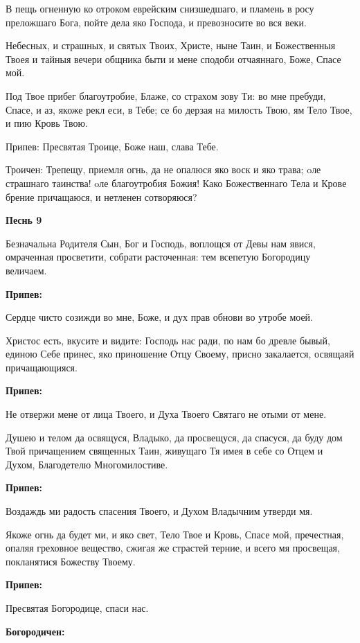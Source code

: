 В пещь огненную ко отроком еврейским снизшедшаго, и пламень в росу преложшаго Бога, пойте дела яко Господа, и превозносите во вся веки.


Небесных, и страшных, и святых Твоих, Христе, ныне Таин, и Божественныя Твоея и тайныя вечери общника быти и мене сподоби отчаяннаго, Боже, Спасе мой.


Под Твое прибег благоутробие, Блаже, со страхом зову Ти: во мне пребуди, Спасе, и аз, якоже рекл еси, в Тебе; се бо дерзая на милость Твою, ям Тело Твое, и пию Кровь Твою.


Припев: Пресвятая Троице, Боже наш, слава Тебе.


Троичен: Трепещу, приемля огнь, да не опалюся яко воск и яко трава; oле страшнаго таинства! oле благоутробия Божия! Како Божественнаго Тела и Крове брение причащаюся, и нетленен сотворяюся?

\medskip
\bfseries Песнь 9\normalfont{}


Безначальна Родителя Сын, Бог и Господь, воплощся от Девы нам явися, омраченная просветити, собрати расточенная: тем всепетую Богородицу величаем.

\medskip
\bfseries Припев:\normalfont{} 


Сердце чисто созижди во мне, Боже, и дух прав обнови во утробе моей.


Христос есть, вкусите и видите: Господь нас ради, по нам бо древле бывый, единою Себе принес, яко приношение Отцу Своему, присно закалается, освящаяй причащающияся.


\medskip
\bfseries Припев:\normalfont{} 


Не отвержи мене от лица Твоего, и Духа Твоего Святаго не отыми от мене.


Душею и телом да освящуся, Владыко, да просвещуся, да спасуся, да буду дом Твой причащением священных Таин, живущаго Тя имея в себе со Отцем и Духом, Благодетелю Многомилостиве.


\medskip
\bfseries Припев:\normalfont{} 


Воздаждь ми радость спасения Твоего, и Духом Владычним утверди мя.


Якоже огнь да будет ми, и яко свет, Тело Твое и Кровь, Спасе мой, пречестная, опаляя греховное вещество, сжигая же страстей терние, и всего мя просвещая, покланятися Божеству Твоему.


\medskip
\bfseries Припев:\normalfont{} 


Пресвятая Богородице, спаси нас.


\medskip
\bfseries Богородичен:\normalfont{}

